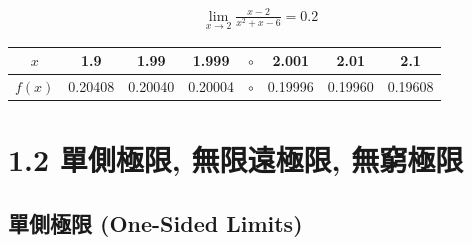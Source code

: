\documentclass[12pt]{extarticle}
\theoremstyle{definition}
\begin{document}
\vspace{5mm}

\begin{minipage}{0.18\textwidth}
\begin{align*}
  \lim_{x\to 2}\frac{x - 2}{x^2 + x - 6} = 0.2
\end{align*}
\end{minipage}
\qquad
\begin{minipage}{0.85\textwidth}
  \begin{tabular}{cccccccc}
    \toprule
    $x$ & 1.9 & 1.99 & 1.999 & $\circ$ & 2.001 & 2.01 & 2.1 \\
    \hline
    \addlinespace[2mm]
    $f(x)$ & 0.20408 & 0.20040 &0.20004 & $\circ$ & 0.19996 & 0.19960 & 0.19608 \\
    \bottomrule
  \end{tabular}
\end{minipage}

\vspace{2mm}

%

\section*{1.2 單側極限, 無限遠極限, 無窮極限}

\subsection*{單側極限 (One-Sided Limits) }
\end{document}
